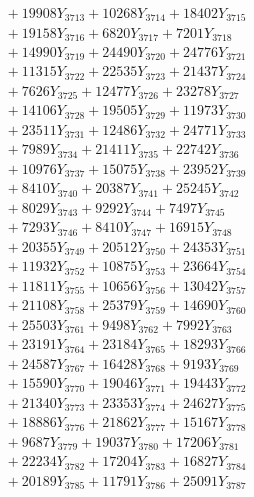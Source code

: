 \documentclass[a4paper,10pt]{article}
\begin{document}
{\begin{align}
&\;  + 19908 Y_{3713} + 10268 Y_{3714} + 18402 Y_{3715} \\[0.3ex]
&\;  + 19158 Y_{3716} + 6820 Y_{3717} + 7201 Y_{3718} \\[0.5ex]\allowbreak
&\;  + 14990 Y_{3719} + 24490 Y_{3720} + 24776 Y_{3721} \\[0.3ex]
&\;  + 11315 Y_{3722} + 22535 Y_{3723} + 21437 Y_{3724} \\[0.3ex]
&\;  + 7626 Y_{3725} + 12477 Y_{3726} + 23278 Y_{3727} \\[0.3ex]
&\;  + 14106 Y_{3728} + 19505 Y_{3729} + 11973 Y_{3730} \\[0.3ex]
&\;  + 23511 Y_{3731} + 12486 Y_{3732} + 24771 Y_{3733} \\[0.3ex]
&\;  + 7989 Y_{3734} + 21411 Y_{3735} + 22742 Y_{3736} \\[0.3ex]
&\;  + 10976 Y_{3737} + 15075 Y_{3738} + 23952 Y_{3739} \\[0.3ex]
&\;  + 8410 Y_{3740} + 20387 Y_{3741} + 25245 Y_{3742} \\[0.3ex]
&\;  + 8029 Y_{3743} + 9292 Y_{3744} + 7497 Y_{3745} \\[0.3ex]
&\;  + 7293 Y_{3746} + 8410 Y_{3747} + 16915 Y_{3748} \\[0.5ex]\allowbreak
&\;  + 20355 Y_{3749} + 20512 Y_{3750} + 24353 Y_{3751} \\[0.3ex]
&\;  + 11932 Y_{3752} + 10875 Y_{3753} + 23664 Y_{3754} \\[0.3ex]
&\;  + 11811 Y_{3755} + 10656 Y_{3756} + 13042 Y_{3757} \\[0.3ex]
&\;  + 21108 Y_{3758} + 25379 Y_{3759} + 14690 Y_{3760} \\[0.3ex]
&\;  + 25503 Y_{3761} + 9498 Y_{3762} + 7992 Y_{3763} \\[0.3ex]
&\;  + 23191 Y_{3764} + 23184 Y_{3765} + 18293 Y_{3766} \\[0.3ex]
&\;  + 24587 Y_{3767} + 16428 Y_{3768} + 9193 Y_{3769} \\[0.3ex]
&\;  + 15590 Y_{3770} + 19046 Y_{3771} + 19443 Y_{3772} \\[0.3ex]
&\;  + 21340 Y_{3773} + 23353 Y_{3774} + 24627 Y_{3775} \\[0.3ex]
&\;  + 18886 Y_{3776} + 21862 Y_{3777} + 15167 Y_{3778} \\[0.5ex]\allowbreak
&\;  + 9687 Y_{3779} + 19037 Y_{3780} + 17206 Y_{3781} \\[0.3ex]
&\;  + 22234 Y_{3782} + 17204 Y_{3783} + 16827 Y_{3784} \\[0.3ex]
&\;  + 20189 Y_{3785} + 11791 Y_{3786} + 25091 Y_{3787} \\[0.3ex]

\end{align}}
\end{document}
